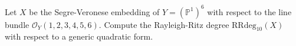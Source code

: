 Let $X$ be the Segre-Veronese embedding of $Y=(\mathbb{P}^1)^6$ with respect to the line bundle $\mathcal{O}_{Y}(1,2,3,4,5,6)$. Compute the Rayleigh-Ritz degree $\mathrm{RRdeg}_{10}(X)$ with respect to a generic quadratic form.
